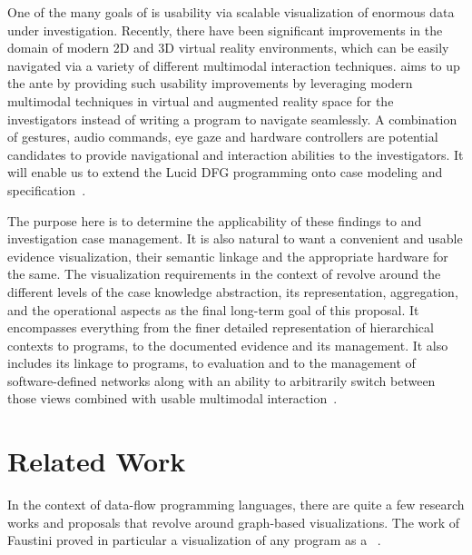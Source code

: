 One of the many goals of {\flucid} is usability via scalable visualization of enormous data
under investigation. Recently, there have been significant improvements in the domain of modern
2D and 3D virtual reality environments, which can be easily navigated via a variety of
different multimodal interaction techniques.
{\flucid} aims to up the ante by providing such usability improvements by leveraging
modern multimodal techniques in virtual and augmented reality space for the investigators instead of writing
a {\flucid} program to navigate seamlessly. A combination of gestures, audio commands,
eye gaze and hardware controllers are potential candidates to provide navigational
and interaction abilities to the investigators. It will enable us to extend the
Lucid DFG programming onto {\flucid} case modeling and specification~\cite{mokhov-phd-thesis-2013,flucid-dfg-viz-pst2011}.


The purpose here is to determine the applicability of these findings to
{\flucid} and investigation case management. It is also natural to want a convenient
and usable evidence visualization, their semantic linkage and the appropriate
hardware for the same. The visualization requirements in the context of
{\flucid} revolve around the different levels of the case knowledge abstraction,
its representation, aggregation, and the operational aspects as the final long-term
goal of this proposal. It encompasses everything from the finer detailed representation
of hierarchical contexts to {\flucid} programs, to the documented evidence and
its management. It also includes its linkage to programs, to evaluation and
to the management of {\gipsy} software-defined networks along with an ability to
arbitrarily switch between those views combined with usable multimodal
interaction~\cite{mokhov-phd-thesis-2013,flucid-dfg-viz-pst2011}.

\section{Related Work}

In the context of data-flow programming languages, there are quite a few 
research works and proposals that revolve around graph-based visualizations. 
The work of Faustini proved in particular a visualization of any {\ilucid} program as a
{\dfg}~\cite{denotational-operational-semantics-dataflow}.

